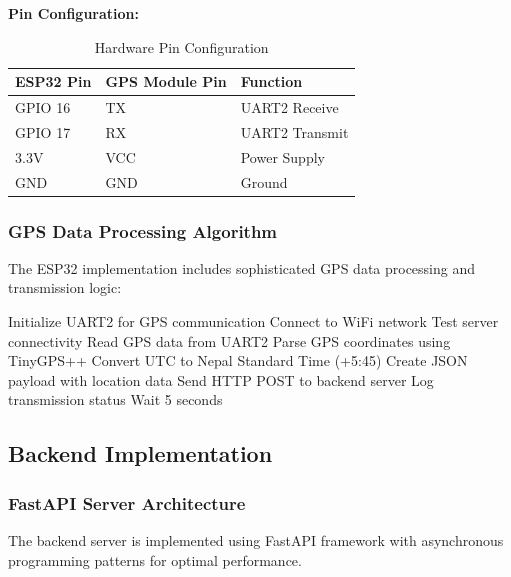 \documentclass[12pt,a4paper]{article}
\begin{document}
\textbf{Pin Configuration:}
\begin{table}[H]
\centering
\begin{tabular}{|l|l|l|}
\hline
\textbf{ESP32 Pin} & \textbf{GPS Module Pin} & \textbf{Function} \\
\hline
GPIO 16 & TX & UART2 Receive \\
GPIO 17 & RX & UART2 Transmit \\
3.3V & VCC & Power Supply \\
GND & GND & Ground \\
\hline
\end{tabular}
\caption{Hardware Pin Configuration}
\label{tab:pin_config}
\end{table}

\subsubsection{GPS Data Processing Algorithm}

The ESP32 implementation includes sophisticated GPS data processing and transmission logic:

\begin{algorithm}
\caption{GPS Data Processing and Transmission}
\begin{algorithmic}[1]
\STATE Initialize UART2 for GPS communication
\STATE Connect to WiFi network
\STATE Test server connectivity
    \STATE Read GPS data from UART2
    \STATE Parse GPS coordinates using TinyGPS++
        \STATE Convert UTC to Nepal Standard Time (+5:45)
        \STATE Create JSON payload with location data
        \STATE Send HTTP POST to backend server
        \STATE Log transmission status
    \ENDIF
    \STATE Wait 5 seconds
\ENDWHILE
\end{algorithmic}
\end{algorithm}

\subsection{Backend Implementation}

\subsubsection{FastAPI Server Architecture}

The backend server is implemented using FastAPI framework with asynchronous programming patterns for optimal performance.
\end{document}

